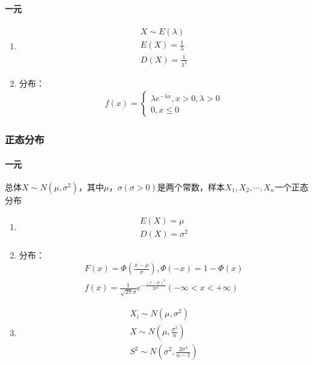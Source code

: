 \documentclass[12pt]{book}
\begin{document}
\paragraph{一元}

\begin{enumerate}[1.]
    \item \begin{gather*}
              X\sim E(\lambda) \\
              E(X)=\frac{1}{\lambda} \\
              D(X)=\frac{1}{\lambda^2}
          \end{gather*}
    \item 分布：
          \begin{gather*}
              f(x)=\begin{cases}
                  \lambda e^{-\lambda x}, x>0, λ>0 \\
                  0, x\leq 0
              \end{cases}
          \end{gather*}
\end{enumerate}






\subsubsection{正态分布}



\paragraph{一元} 

总体$X\sim N(\mu,\sigma^2)$，其中$\mu$，$\sigma(\sigma>0)$是两个常数，样本$X_1,X_2,\cdots,X_n$一个正态分布


\begin{enumerate}[1.]
    \item \begin{gather*}
        E(X)=\mu \\
        D(X)=\sigma^2 
    \end{gather*}
    \item 分布：
    \begin{gather*}
        F\left(x\right)=\Phi\left(\frac{x-\mu}{\sigma}\right), \Phi\left(-x\right)=1-\Phi\left(x\right)\\
        f\left(x\right)=\frac{1}{\sqrt{2\pi}\sigma}e^{-\frac{\left(x-\mu\right)^2}{2\sigma^2}}(-\infty<x<+\infty)
    \end{gather*}
    \item \begin{gather*}
        X_i\sim N(\mu,\sigma^2) \\
        X\sim N(\mu,\frac{\sigma^2}{n}) \\
        S^2\sim N(\sigma^2,\frac{2\sigma^4}{n-1}) 
    \end{gather*}
\end{enumerate}
\end{document}
